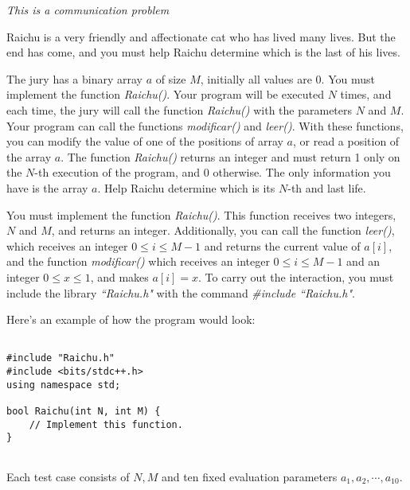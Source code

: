 \documentclass[12pt]{scrartcl}
\begin{document}
    
    {\itshape This is a communication problem}
    
    \vspace{10pt}

        Raichu is a very friendly and affectionate cat who has lived many lives. But the end has come, and you must help Raichu determine which is the last of his lives.


        The jury has a binary array $a$ of size $M$, initially all values are $0$. You must implement the function {\itshape Raichu()}. Your program will be executed $N$ times, and each time, the jury will call the function {\itshape Raichu()} with the parameters $N$ and $M$. Your program can call the functions {\itshape modificar()} and {\itshape leer()}. With these functions, you can modify the value of one of the positions of array $a$, or read a position of the array $a$. The function {\itshape Raichu()} returns an integer and must return 1 only on the $N$-th execution of the program, and 0 otherwise. The only information you have is the array $a$. Help Raichu determine which is its $N$-th and last life.


        You must implement the function {\itshape Raichu()}. This function receives two integers, $N$ and $M$, and returns an integer. Additionally, you can call the function {\itshape leer()}, which receives an integer $0 \le i \le M - 1$ and returns the current value of $a[i]$, and the function {\itshape modificar()} which receives an integer $0 \le i \le M - 1$ and an integer $0 \le x \le 1$, and makes $a[i] = x$.
        To carry out the interaction, you must include the library \textit{``Raichu.h"} with the command \textit{\#include ``Raichu.h"}.

        Here's an example of how the program would look:

\begin{verbatim}

#include "Raichu.h"
#include <bits/stdc++.h>
using namespace std;

bool Raichu(int N, int M) {
    // Implement this function.
}
    
\end{verbatim}
    


        Each test case consists of $N, M$ and ten fixed evaluation parameters $a_1, a_2, \cdots, a_{10}$.
\end{document}
